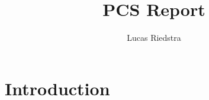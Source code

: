 \documentclass{article}
\title{PCS Report}
\author{Lucas Riedstra}
\theoremstyle{plain}
\theoremstyle{definition}
\theoremstyle{remark}
\begin{document}
\maketitle
\tableofcontents
\newpage

\section{Introduction}
\end{document}
